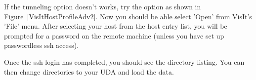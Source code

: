 \documentclass[12pt]{article}
\begin{document}
If the tunneling option doesn't works, try the option as shown in
Figure~\ref{VisItHostProfileAdv2}. Now you should be able select
'Open' from VisIt's 'File' menu. After selecting your host from the
host entry list, you will be prompted for a password on the remote
machine (unless you have set up passwordless ssh access).

Once the ssh login has completed, you should see the directory
listing. You can then change directories to your UDA and load the
data.









\end{document}
